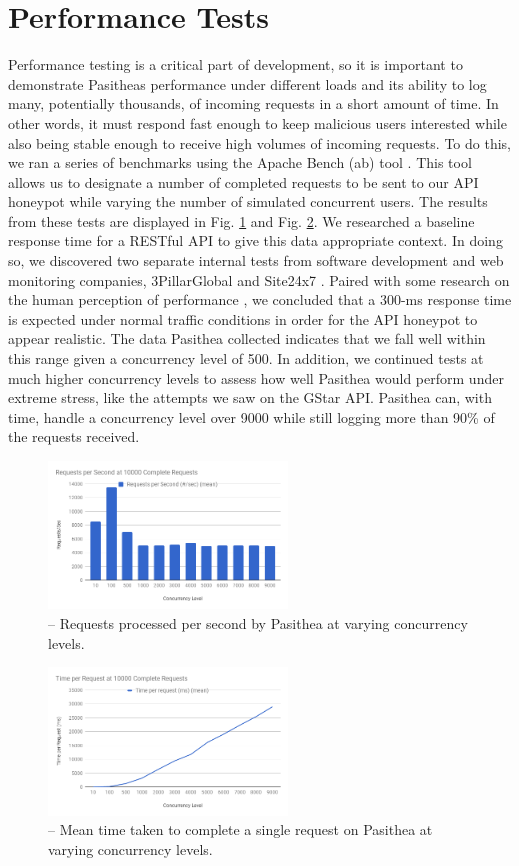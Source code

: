 \section{Performance Tests}
\label{performance}
Performance testing is a critical part of development, so it is important to demonstrate Pasitheas performance under different loads and its ability to log many, potentially thousands, of incoming requests in a short amount of time. In other words, it must respond fast enough to keep malicious users interested while also being stable enough to receive high volumes of incoming requests. To do this, we ran a series of benchmarks using the Apache Bench (ab) tool \cite{ab}. This tool allows us to designate a number of completed requests to be sent to our API honeypot while varying the number of simulated concurrent users. The results from these tests are displayed in Fig. \ref{fig:R/s} and Fig. \ref{fig:T/R}. We researched a baseline response time for a RESTful API to give this data appropriate context. In doing so, we discovered two separate internal tests from software development and web monitoring companies, 3PillarGlobal \cite{3Pillar} and Site24x7 \cite{site24x7}. Paired with some research on the human perception of performance \cite{performance}, we concluded that a 300-ms response time is expected under normal traffic conditions in order for the API honeypot to appear realistic. The data Pasithea collected indicates that we fall well within this range given a concurrency level of 500. In addition, we continued tests at much higher concurrency levels to assess how well Pasithea would perform under extreme stress, like the attempts we saw on the GStar API. Pasithea can, with time, handle a concurrency level over 9000 while still logging more than 90\% of the requests received.

\begin{figure}[ht]
\centering
\includegraphics[width=2.5in]{images/RequestsperSecond.png} 
\caption{-- Requests processed per second by Pasithea at varying concurrency levels.}
\label{fig:R/s}
\end{figure}

\begin{figure}[ht]
\centering
\includegraphics[width=2.5in]{images/TimeperRequest.png} 
\caption{-- Mean time taken to complete a single request on Pasithea at varying concurrency levels.}
\label{fig:T/R}
\end{figure}

